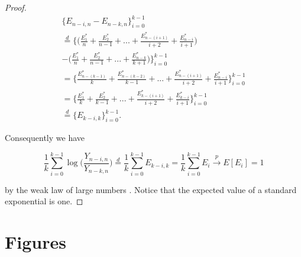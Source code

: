 \documentclass[english,12pt,a4paper,pdftex,sci,utf8]{aaltothesis} %
\begin{document}
\begin{proof}
\begin{equation*}
\begin{split}
\big\{E_{n-i,n} - E_{n-k,n}\big\}_{i=0}^{k-1} \\ 
\overset{d}{=} \bigg\{\Big( \frac{E_1^*}{n} + \frac{E_2^*}{n-1}+...+ \frac{E_{n-(i+1)}^*}{i+2} + \frac{E_{n-i}^*}{i+1} \Big) \\
- \Big(\frac{E_1^*}{n} + \frac{E_2^*}{n-1}+...+\frac{E_{n-k}^*}{k+1}\Big)\bigg\}_{i=0}^{k-1} \\
= \bigg\{ \frac{E_{n-(k-1)}^*}{k} + \frac{E_{n-(k-2)}^*}{k-1}+...+  \frac{E_{n-(i+1)}^*}{i+2} + \frac{E_{n-i}^*}{i+1} \bigg\}_{i=0}^{k-1} \\
= \bigg\{ \frac{E_1^*}{k} + \frac{E_2^*}{k-1}+...+\frac{E_{k-(i+1)}^*}{i+2} + \frac{E_{k-i}^*}{i+1} \bigg\}_{i=0}^{k-1}   \\
\overset{d}{=} \big\{E_{k-i,k}\big\}_{i=0}^{k-1}.
\end{split}
\end{equation*}

Consequently we have

\begin{equation*}
\frac{1}{k} \sum_{i=0}^{k-1} \log\Big(\frac{Y_{n-i,n}}{Y_{n-k,n}}\Big) \overset{d}{=} \frac{1}{k} \sum_{i=0}^{k-1} E_{k-i,k} = \frac{1}{k} \sum_{i=0}^{k-1} E_i \xrightarrow{p} E[E_i] = 1
\end{equation*}

by the weak law of large numbers \cite{rosenthal}. Notice that the expected value of a standard exponential is one.



\end{proof}

\section{Figures}
\label{figures}
\end{document}
